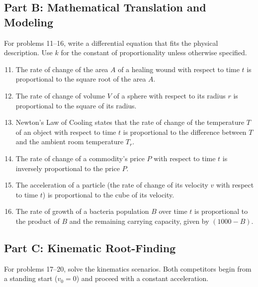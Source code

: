 \documentclass{article}
\begin{document}
\subsection*{Part B: Mathematical Translation and Modeling}
For problems 11--16, write a differential equation that fits the physical description. Use $k$ for the constant of proportionality unless otherwise specified.

\begin{enumerate}
    \setcounter{enumi}{10}
    \item The rate of change of the area $A$ of a healing wound with respect to time $t$ is proportional to the square root of the area $A$.
    \item The rate of change of volume $V$ of a sphere with respect to its radius $r$ is proportional to the square of its radius.
    \item Newton's Law of Cooling states that the rate of change of the temperature $T$ of an object with respect to time $t$ is proportional to the difference between $T$ and the ambient room temperature $T_r$.
    \item The rate of change of a commodity's price $P$ with respect to time $t$ is inversely proportional to the price $P$.
    \item The acceleration of a particle (the rate of change of its velocity $v$ with respect to time $t$) is proportional to the cube of its velocity.
    \item The rate of growth of a bacteria population $B$ over time $t$ is proportional to the product of $B$ and the remaining carrying capacity, given by $(1000 - B)$.
\end{enumerate}

\subsection*{Part C: Kinematic Root-Finding}
For problems 17--20, solve the kinematics scenarios. Both competitors begin from a standing start ($v_0 = 0$) and proceed with a constant acceleration.
\end{document}
